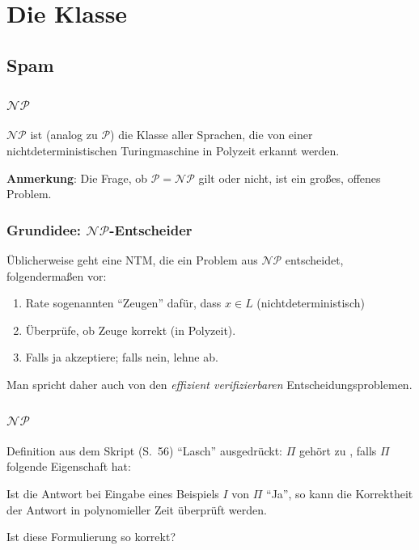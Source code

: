 

\section{Die Klasse \classNP}
\subsection{Spam}
\begin{frame}
\frametitle{$\mathcal{NP}$}

$\mathcal{NP}$ ist (analog zu $\mathcal{P}$) die Klasse aller Sprachen, die von einer nichtdeterministischen Turingmaschine in Polyzeit erkannt werden.

\ducttape{1cm}

\textbf{Anmerkung}: Die Frage, ob $\mathcal{P} = \mathcal{NP}$ gilt oder nicht, ist ein großes, offenes Problem.
\end{frame}

\begin{frame}
\frametitle{Grundidee: $\mathcal{NP}$-Entscheider}
Üblicherweise geht eine NTM, die ein Problem aus $\mathcal{NP}$ entscheidet, folgendermaßen vor: 
\begin{enumerate}
\item Rate sogenannten "`Zeugen"' dafür, dass $x \in L$ (nichtdeterministisch)
\item Überprüfe, ob Zeuge korrekt (in Polyzeit).
\item Falls ja akzeptiere; falls nein, lehne ab.
\end{enumerate}
Man spricht daher auch von den \emph{effizient verifizierbaren} Entscheidungsproblemen.
\end{frame}

\begin{frame}
\frametitle{$\mathcal{NP}$}

\begin{block}{Definition aus dem Skript (S.~56)}
"`Lasch"' ausgedrückt: $\Pi$ gehört zu \classNP, falls $\Pi$ folgende Eigenschaft hat:

Ist die Antwort bei Eingabe eines Beispiels $I$ von $\Pi$ "`Ja"', so kann die Korrektheit der Antwort in polynomieller Zeit überprüft werden.
\end{block}

\ducttape{1cm}

Ist diese Formulierung so korrekt?

\end{frame}

